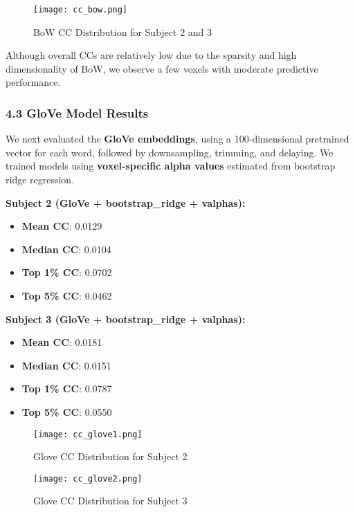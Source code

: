 \documentclass[11pt]{article}
\begin{document}
\begin{figure}
\centering
\texttt{[image: cc\_bow.png]}
\caption{BoW CC Distribution for Subject 2 and 3}
\end{figure}

Although overall CCs are relatively low due to the sparsity and high
dimensionality of BoW, we observe a few voxels with moderate predictive
performance.

\hypertarget{glove-model-results}{%
\subsubsection{4.3 GloVe Model Results}\label{glove-model-results}}

We next evaluated the \textbf{GloVe embeddings}, using a 100-dimensional
pretrained vector for each word, followed by downsampling, trimming, and
delaying. We trained models using \textbf{voxel-specific alpha values}
estimated from bootstrap ridge regression.

\textbf{Subject 2 (GloVe + bootstrap\_ridge + valphas):}

\begin{itemize}
\item
  \textbf{Mean CC}: 0.0129
\item
  \textbf{Median CC}: 0.0104
\item
  \textbf{Top 1\% CC}: 0.0702
\item
  \textbf{Top 5\% CC}: 0.0462
\end{itemize}

\textbf{Subject 3 (GloVe + bootstrap\_ridge + valphas):}

\begin{itemize}
\item
  \textbf{Mean CC}: 0.0181
\item
  \textbf{Median CC}: 0.0151
\item
  \textbf{Top 1\% CC}: 0.0787
\item
  \textbf{Top 5\% CC}: 0.0550
\end{itemize}

\begin{figure}
\centering
\texttt{[image: cc\_glove1.png]}
\caption{Glove CC Distribution for Subject 2}
\end{figure}

\begin{figure}
\centering
\texttt{[image: cc\_glove2.png]}
\caption{Glove CC Distribution for Subject 3}
\end{figure}
\end{document}
